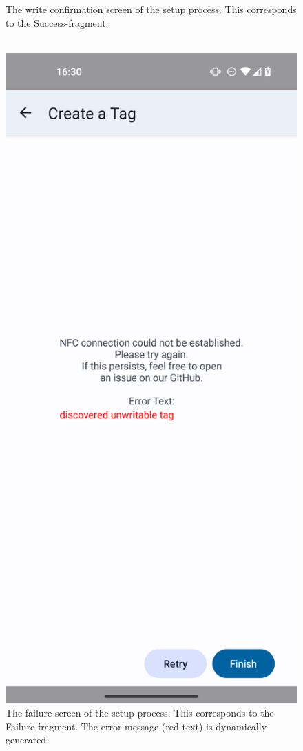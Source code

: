 \documentclass[conference]{IEEEtran}
\newcommand{\phonescreenwidth}{2.69in}
\begin{document}
\begin{figure}
\begin{minipage}{\phonescreenwidth}
		\caption{The write confirmation screen of the setup process. This corresponds to the Success-fragment.\\~}
	\label{fig:setup-success}
\end{minipage}
\begin{minipage}{\phonescreenwidth}
	\includegraphics[width=\textwidth]{screenshots/s-failure.png}
		\caption{The failure screen of the setup process. This corresponds to the Failure-fragment. The error message (red text) is dynamically generated.}
	\label{fig:setup-failure}
\end{minipage}
\end{figure}
\end{document}
